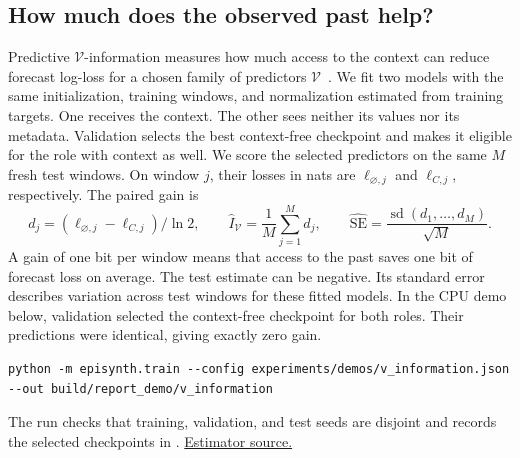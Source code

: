 \documentclass[11pt,a4paper]{article}
\newcommand{\repolink}[2]{\href{https://github.com/intsystems/Epiplexity/blob/main/#1}{#2}}
\begin{document}
\subsection{How much does the observed past help?}\label{sec:pvi}
Predictive $\mathcal V$-information measures how much access to the context
can reduce forecast log-loss for a chosen family of predictors
$\mathcal V$~\cite{xu2020}. We fit two models with the same initialization,
training windows, and normalization estimated from training targets. One
receives the context. The other sees neither its values nor its metadata.
Validation selects the best context-free checkpoint and makes it eligible
for the role with context as well. We score the selected predictors on
the same $M$ fresh test windows. On window $j$, their losses in nats are
$\ell_{\varnothing,j}$ and $\ell_{C,j}$, respectively. The paired gain is
\begin{equation}
 d_j=(\ell_{\varnothing,j}-\ell_{C,j})/\ln 2,\qquad
 \widehat I_{\mathcal V}=\frac1M\sum_{j=1}^M d_j,\qquad
 \widehat{\mathrm{SE}}=\frac{\operatorname{sd}(d_1,\ldots,d_M)}{\sqrt M}.
 \label{eq:pvi}
\end{equation}
A gain of one bit per window means that access to the past saves one bit of
forecast loss on average. The test estimate can be negative. Its standard
error describes variation across test windows for these fitted models.
In the CPU demo below, validation selected the context-free checkpoint for
both roles. Their predictions were identical, giving exactly zero gain.
\begin{lstlisting}
python -m episynth.train --config experiments/demos/v_information.json --out build/report_demo/v_information
\end{lstlisting}
The run checks that training, validation, and test seeds are disjoint and
records the selected checkpoints in .
\repolink{src/episynth/estimators/v_information.py}{Estimator source.}
\end{document}
